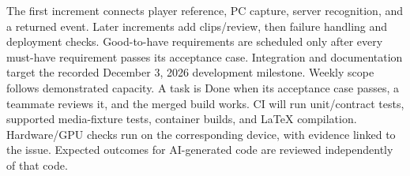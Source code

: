 The first increment connects player reference, PC capture, server recognition, and a returned event. Later increments add clips/review, then failure handling and deployment checks. Good-to-have requirements are scheduled only after every must-have requirement passes its acceptance case. Integration and documentation target the recorded December 3, 2026 development milestone. Weekly scope follows demonstrated capacity. A task is Done when its acceptance case passes, a teammate reviews it, and the merged build works. CI will run unit/contract tests, supported media-fixture tests, container builds, and LaTeX compilation. Hardware/GPU checks run on the corresponding device, with evidence linked to the issue. Expected outcomes for AI-generated code are reviewed independently of that code.
